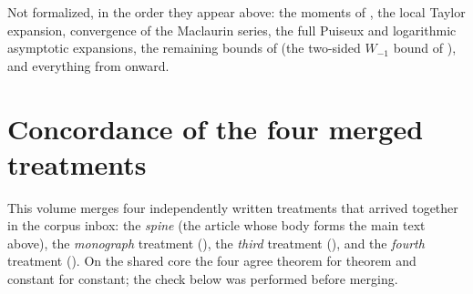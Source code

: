 \documentclass[11pt]{article}
\theoremstyle{remark}
\begin{document}
Not formalized, in the order they appear above: the moments of
, the local Taylor expansion, convergence of the
Maclaurin series, the full Puiseux and
logarithmic asymptotic expansions, the remaining bounds of
 (the two-sided \(W_{-1}\) bound of
), and everything from
 onward.

\section{Concordance of the four merged treatments}\label{app:concordance}

This volume merges four independently written treatments that arrived
together in the corpus inbox: the \emph{spine} (the article whose body forms
the main text above), the \emph{monograph} treatment
(), the \emph{third} treatment
(), and the \emph{fourth} treatment
().  On the shared core the four agree
theorem for theorem and constant for constant; the check below was performed
before merging.
\end{document}
